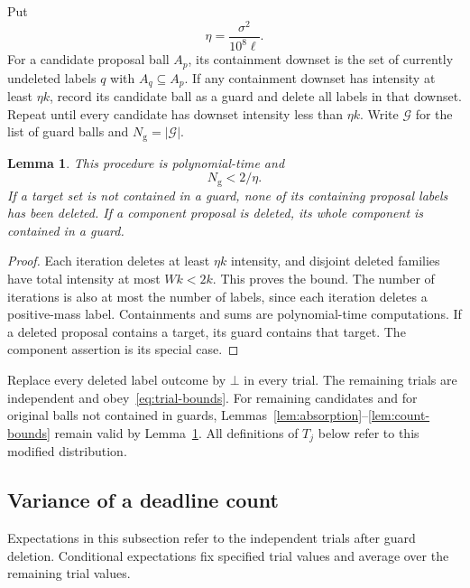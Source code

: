 \documentclass[11pt]{article}
\numberwithin{equation}{section}
\newtheorem{lemma}[theorem]{Lemma}
\theoremstyle{definition}
\begin{document}
Put
\begin{equation}\label{eq:guard-eta}
 \eta=\frac{\sigma^2}{10^8\ell}.
\end{equation}
For a candidate proposal ball $A_p$, its containment downset is the
set of currently undeleted labels $q$ with $A_q\subseteq A_p$.
If any containment downset has intensity at least $\eta k$, record its
candidate ball as a guard and delete all labels in that downset.
Repeat until every candidate has downset intensity less than $\eta k$.
Write $\mathcal G$ for the list of guard balls and
$N_{\mathrm g}=|\mathcal G|$.

\begin{lemma}\label{lem:guards}
This procedure is polynomial-time and
\begin{equation}\label{eq:guard-count}
 N_{\mathrm g}<2/\eta.
\end{equation}
If a target set is not contained in a guard, none of its containing
proposal labels has been deleted. If a component proposal is deleted,
its whole component is contained in a guard.
\end{lemma}
\begin{proof}
Each iteration deletes at least $\eta k$ intensity, and disjoint deleted
families have total intensity at most $Wk<2k$. This proves the bound.
The number of iterations is also at most the number of labels, since
each iteration deletes a positive-mass label. Containments and sums
are polynomial-time computations. If a deleted proposal contains a
target, its guard contains that target. The component assertion is its
special case.
\end{proof}

Replace every deleted label outcome by $\bot$ in every trial. The
remaining trials are independent and obey~\eqref{eq:trial-bounds}.
For remaining candidates and for original balls not contained in guards,
Lemmas~\ref{lem:absorption}--\ref{lem:count-bounds} remain valid by
Lemma~\ref{lem:guards}.
All definitions of $T_j$ below refer to this modified distribution.

\subsection{Variance of a deadline count}

Expectations in this subsection refer to the independent trials after
guard deletion. Conditional expectations fix specified trial values
and average over the remaining trial values.
\end{document}
